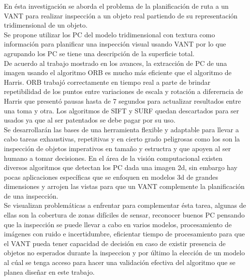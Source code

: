 \documentclass[]{report}
\begin{document}
En ésta investigación se aborda el problema de la planificación de ruta a un VANT para realizar inspección a un objeto real partiendo de su representación tridimensional de un objeto.\\ Se propone utilizar los PC del modelo tridimensional con textura como información para planificar una inspección visual usando VANT por lo que agrupando los PC se tiene una descripción de la superficie total.\\
De acuerdo al trabajo mostrado en los avances, la extracción de PC de una imagen usando el algoritmo ORB es mucho más eficiente que el algoritmo de Harris. ORB trabajó correctamente en tiempo real a parte de brindar repetibilidad de los puntos entre variaciones de escala y rotación a difererncia de Harris que presentó pausas hasta de 7 segundos para actualizar resultados entre una toma y otra. Los algoritmos de SIFT y SURF quedan descartados para ser usados ya que al ser patentados se debe pagar por su uso.\\
Se desarrollarán las bases de una herramienta flexible y adaptable para llevar a cabo tareas exhaustivas, repetitivas y en cierto grado peligrosas como los son la inspección de objetos imperativos en tamaño y estructra y que apoyen al ser humano a tomar decisiones. En el área de la visión computacional existen diversos algoritmos que detectan los PC dada una imagen 2d, sin embargo hay pocas aplicaciones específicas que se enfoquen en modelos 3d de grandes dimensiones y arrojen las vistas para que un VANT complemente la planificación de una inspección.\\ Se visualizan problemáticas a enfrentar para complementar ésta tarea, algunas de ellas son la cobertura de zonas difíciles de sensar, reconocer buenos PC pensando que la inspección se puede llevar a cabo en varios modelos, procesamiento de imágenes con ruido e incertidumbre, eficientar tiempo de procesamiento para que el VANT pueda tener capacidad de decisión en caso de existir presencia de objetos no esperados durante la inspeccion y  por último la elección de un modelo al cúal se tenga acceso para hacer una validación efectiva del algoritmo que se planea diseñar en este trabajo.



\end{document}
